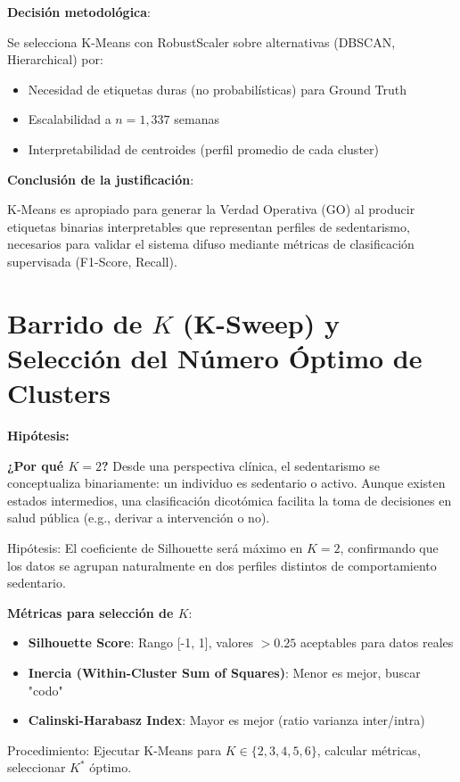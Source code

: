 \documentclass[12pt,letterpaper,twoside]{report}
\begin{document}
\begin{decisionbox}
\textbf{Decisión metodológica}:

Se selecciona K-Means con RobustScaler sobre alternativas (DBSCAN, Hierarchical) por:
\begin{itemize}[noitemsep]
    \item Necesidad de etiquetas duras (no probabilísticas) para Ground Truth
    \item Escalabilidad a $n=1,337$ semanas
    \item Interpretabilidad de centroides (perfil promedio de cada cluster)
\end{itemize}
\end{decisionbox}

\begin{conclusionbox}
\textbf{Conclusión de la justificación}:

K-Means es apropiado para generar la Verdad Operativa (GO) al producir etiquetas binarias interpretables que representan perfiles de sedentarismo, necesarios para validar el sistema difuso mediante métricas de clasificación supervisada (F1-Score, Recall).
\end{conclusionbox}

\section{Barrido de $K$ (K-Sweep) y Selección del Número Óptimo de Clusters}

\begin{hipotesisbox}
\textbf{Hipótesis:}

\textbf{¿Por qué $K=2$?} Desde una perspectiva clínica, el sedentarismo se conceptualiza binariamente: un individuo es sedentario o activo. Aunque existen estados intermedios, una clasificación dicotómica facilita la toma de decisiones en salud pública (e.g., derivar a intervención o no).

Hipótesis: El coeficiente de Silhouette será máximo en $K=2$, confirmando que los datos se agrupan naturalmente en dos perfiles distintos de comportamiento sedentario.
\end{hipotesisbox}

\begin{estadisticobox}
\textbf{Métricas para selección de $K$}:

\begin{itemize}[noitemsep]
    \item \textbf{Silhouette Score}: Rango [-1, 1], valores $> 0.25$ aceptables para datos reales
    \item \textbf{Inercia (Within-Cluster Sum of Squares)}: Menor es mejor, buscar "codo"
    \item \textbf{Calinski-Harabasz Index}: Mayor es mejor (ratio varianza inter/intra)
\end{itemize}

Procedimiento: Ejecutar K-Means para $K \in \{2, 3, 4, 5, 6\}$, calcular métricas, seleccionar $K^*$ óptimo.
\end{estadisticobox}
\end{document}
